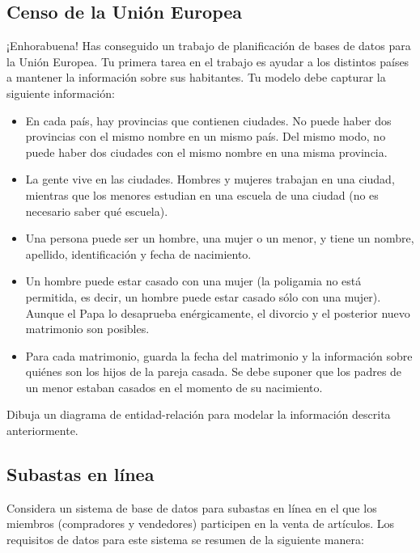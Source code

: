 \documentclass{db-practice}
\begin{document}
\subsection{Censo de la Unión Europea}
¡Enhorabuena! Has conseguido un trabajo de planificación de bases de datos para la Unión Europea. Tu primera tarea en el trabajo es ayudar a los distintos países a mantener la información sobre sus habitantes. Tu modelo debe capturar la siguiente información:

\begin{itemize}
    \item En cada país, hay provincias que contienen ciudades. No puede haber dos provincias con el mismo nombre en un mismo país. Del mismo modo, no puede haber dos ciudades con el mismo nombre en una misma provincia.
    \item La gente vive en las ciudades. Hombres y mujeres trabajan en una ciudad, mientras que los menores estudian en una escuela de una ciudad (no es necesario saber qué escuela).
    \item Una persona puede ser un hombre, una mujer o un menor, y tiene un nombre, apellido, identificación y fecha de nacimiento.
    \item Un hombre puede estar casado con una mujer (la poligamia no está permitida, es decir, un hombre puede estar casado sólo con una mujer). Aunque el Papa lo desaprueba enérgicamente, el divorcio y el posterior nuevo matrimonio son posibles.
    \item Para cada matrimonio, guarda la fecha del matrimonio y la información sobre quiénes son los hijos de la pareja casada. Se debe suponer que los padres de un menor estaban casados en el momento de su nacimiento.
\end{itemize}

Dibuja un diagrama de entidad-relación para modelar la información descrita anteriormente.

\subsection{Subastas en línea}

Considera un sistema de base de datos para subastas en línea en el que los miembros (compradores y vendedores) participen en la venta de artículos. Los requisitos de datos para este sistema se resumen de la siguiente manera: 
\end{document}
